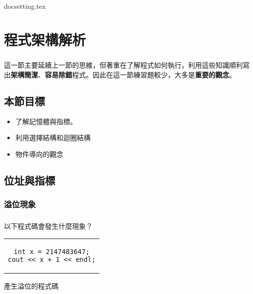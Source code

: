 \documentclass[12pt,a4paper,oneside]{report}
\begin{document}
\begin{CJK}{UTF8}{bkai}

{docsetting.tex}
\setcounter{chapter}{1}

\fi


\chapter{程式架構解析}

\paragraph{}這一節主要延續上一節的思維，但著重在了解程式如何執行，利用這些知識順利寫出\textbf{架構簡潔}、\textbf{容易除錯}程式。因此在這一節練習題較少，大多是\textbf{重要的觀念}。

\section*{本節目標}

\begin{itemize}
\item 了解記憶體與指標。
\item 利用選擇結構和迴圈結構
\item 物件導向的觀念
\end{itemize}

\section{位址與指標}

\subsection{溢位現象}

\paragraph{}以下程式碼會發生什麼現象？
\begin{code}[h!]
\centering
\begin{tabular}{c}
\begin{lstlisting}
int x = 2147483647;
cout << x + 1 << endl;
\end{lstlisting}
\end{tabular}
\caption{產生溢位的程式碼}
\label{program:struct:code:overflow}
\end{code}


\end{CJK}
\end{document}

